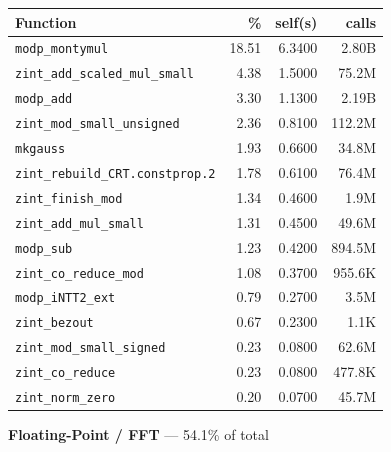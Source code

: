 \documentclass[11pt,a4paper]{article}
\begin{document}
\begin{longtable}{p{7.5cm}rrr}
\toprule
Function & \% & self(s) & calls \\
\midrule
\endhead
  \texttt{modp\_montymul} & 18.51 & 6.3400 & 2.80B \\
  \texttt{zint\_add\_scaled\_mul\_small} & 4.38 & 1.5000 & 75.2M \\
  \texttt{modp\_add} & 3.30 & 1.1300 & 2.19B \\
  \texttt{zint\_mod\_small\_unsigned} & 2.36 & 0.8100 & 112.2M \\
  \texttt{mkgauss} & 1.93 & 0.6600 & 34.8M \\
  \texttt{zint\_rebuild\_CRT.constprop.2} & 1.78 & 0.6100 & 76.4M \\
  \texttt{zint\_finish\_mod} & 1.34 & 0.4600 & 1.9M \\
  \texttt{zint\_add\_mul\_small} & 1.31 & 0.4500 & 49.6M \\
  \texttt{modp\_sub} & 1.23 & 0.4200 & 894.5M \\
  \texttt{zint\_co\_reduce\_mod} & 1.08 & 0.3700 & 955.6K \\
  \texttt{modp\_iNTT2\_ext} & 0.79 & 0.2700 & 3.5M \\
  \texttt{zint\_bezout} & 0.67 & 0.2300 & 1.1K \\
  \texttt{zint\_mod\_small\_signed} & 0.23 & 0.0800 & 62.6M \\
  \texttt{zint\_co\_reduce} & 0.23 & 0.0800 & 477.8K \\
  \texttt{zint\_norm\_zero} & 0.20 & 0.0700 & 45.7M \\
\bottomrule
\end{longtable}

\noindent\colorbox{fpcolor}{\strut \textbf{Floating-Point / FFT} --- 54.1\% of total}
\vspace{2pt}
\end{document}
